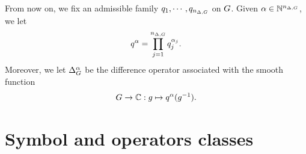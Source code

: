 \begin{remark}
    From now on, we fix an admissible family $q_1, \cdots, q_{n_{\Delta, G}}$ on $G$.
    Given $\alpha \in \mathbb{N}^{n_{\Delta, G}}$, we let
    \begin{align*}
        q^\alpha = \prod_{j = 1}^{n_{\Delta, G}} q_j^{\alpha_j}.
    \end{align*}
    Moreover, we let ${\Delta_{G}^{\alpha}}$ be the difference operator associated with the smooth function
    \begin{align*}
        G \to \mathbb{C} : g \mapsto q^\alpha(g^{-1}).
    \end{align*}
\end{remark}

\section{Symbol and operators classes}

